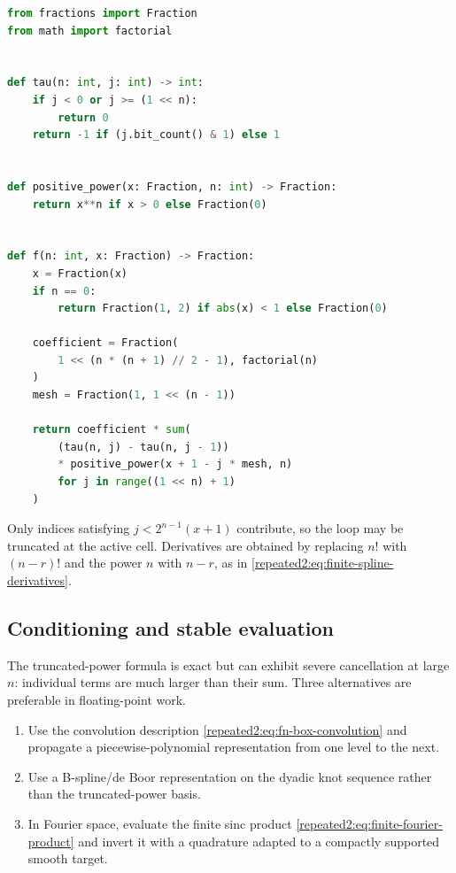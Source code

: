 \documentclass[11pt,oneside]{article}
\theoremstyle{definition}
\theoremstyle{remark}
\begin{document}
\begin{lstlisting}[style=reportcode,language=Python,caption={Exact evaluation of the finite iterates.},label={repeated2:lst:exact-evaluator}]
from fractions import Fraction
from math import factorial


def tau(n: int, j: int) -> int:
    if j < 0 or j >= (1 << n):
        return 0
    return -1 if (j.bit_count() & 1) else 1


def positive_power(x: Fraction, n: int) -> Fraction:
    return x**n if x > 0 else Fraction(0)


def f(n: int, x: Fraction) -> Fraction:
    x = Fraction(x)
    if n == 0:
        return Fraction(1, 2) if abs(x) < 1 else Fraction(0)

    coefficient = Fraction(
        1 << (n * (n + 1) // 2 - 1), factorial(n)
    )
    mesh = Fraction(1, 1 << (n - 1))

    return coefficient * sum(
        (tau(n, j) - tau(n, j - 1))
        * positive_power(x + 1 - j * mesh, n)
        for j in range((1 << n) + 1)
    )
\end{lstlisting}

Only indices satisfying $j<2^{n-1}(x+1)$ contribute, so the loop may be truncated at the
active cell.  Derivatives are obtained by replacing $n!$ with $(n-r)!$ and the power $n$
with $n-r$, as in \eqref{repeated2:eq:finite-spline-derivatives}.

\subsection{Conditioning and stable evaluation}

The truncated-power formula is exact but can exhibit severe cancellation at large $n$:
individual terms are much larger than their sum.  Three alternatives are preferable in
floating-point work.

\begin{enumerate}[label=\textup{(\roman*)}]
\item Use the convolution description \eqref{repeated2:eq:fn-box-convolution} and propagate a
piecewise-polynomial representation from one level to the next.
\item Use a B-spline/de Boor representation on the dyadic knot sequence rather than the
truncated-power basis.
\item In Fourier space, evaluate the finite sinc product \eqref{repeated2:eq:finite-fourier-product}
and invert it with a quadrature adapted to a compactly supported smooth target.
\end{enumerate}
\end{document}
